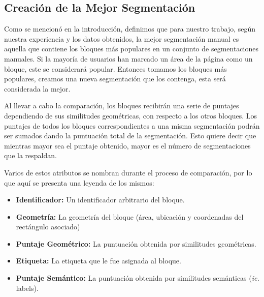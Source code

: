 \documentclass[10pt]{revecom}
\begin{document}
\subsection{Creación de la Mejor Segmentación}

Como se mencionó en la introducción, definimos que para nuestro trabajo, según nuestra experiencia y los datos obtenidos, la mejor segmentación manual es aquella que contiene los bloques más populares en un conjunto de segmentaciones manuales.
Si la mayoría de usuarios han marcado un área de la página como un bloque, este se considerará popular.
Entonces tomamos los bloques más populares, creamos una nueva segmentación que los contenga, esta será considerada la mejor.

Al llevar a cabo la comparación, los bloques recibirán una serie de puntajes dependiendo de sus similitudes geométricas, con respecto a los otros bloques. 
Los puntajes de todos los bloques correspondientes a una misma segmentación podrán ser sumados dando la puntuación total de la segmentación. 
Esto quiere decir que mientras mayor sea el puntaje obtenido, mayor es el número de segmentaciones que la respaldan. 

Varios de estos atributos se nombran durante el proceso de comparación, por lo que aquí se presenta una leyenda de los mismos:
\begin{itemize}
\item \textbf{Identificador:} Un identificador arbitrario del bloque. 
\item \textbf{Geometría:} La geometría del bloque (área, ubicación y coordenadas del rectángulo asociado)
\item \textbf{Puntaje Geométrico:} La puntuación obtenida por similitudes geométricas. 
\item \textbf{Etiqueta:} La etiqueta que le fue asignada al bloque. 
\item \textbf{Puntaje Semántico:} La puntuación obtenida por similitudes semánticas (\emph{ie.} labels). 
\end{itemize}
\end{document}
